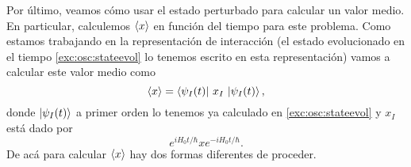 \documentclass[10pt, a4paper]{article}
\numberwithin{equation}{subsection}
\begin{document}
\bigbreak

Por último, veamos cómo usar el estado perturbado para calcular un valor medio.
En particular, calculemos $\expval{x}$ en función del tiempo para este
problema. Como estamos trabajando en la representación de interacción (el
estado evolucionado en el tiempo \eqref{exc:osc:stateevol} lo tenemos escrito en
esta representación) vamos a calcular este valor medio como
\begin{equation}
  \expval{x} = \bra{\psi_I(t)}\,x_{I}\,\ket{\psi_I(t)},
\end{equation}
donde $\ket{\psi_I(t)}$ a primer orden lo tenemos ya calculado en
\eqref{exc:osc:stateevol} y $x_{I}$ está dado por
\begin{equation}
  e^{iH_0t/\hbar}xe^{-iH_0t/\hbar}.
\end{equation}
De acá para calcular $\expval{x}$ hay dos formas diferentes de proceder.
\end{document}
